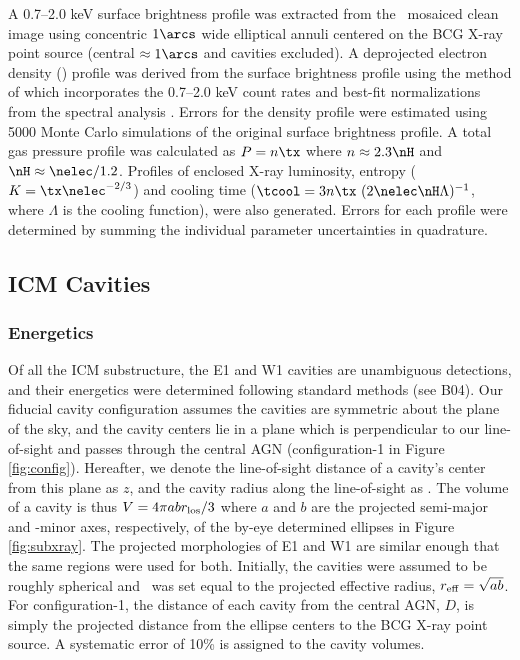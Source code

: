 \documentclass[iop]{emulateapj-rtx4}
\begin{document}
A 0.7--2.0 keV surface brightness profile was extracted from the
\cxo\ mosaiced clean image using concentric $1\arcs$ wide elliptical
annuli centered on the BCG X-ray point source (central $\approx
1\arcs$ and cavities excluded). A deprojected electron density
(\nelec) profile was derived from the surface brightness profile using
the method of \citet{kriss83} which incorporates the 0.7--2.0 keV
count rates and best-fit normalizations from the spectral analysis
\citep[see][for details]{accept}. Errors for the density profile were
estimated using 5000 Monte Carlo simulations of the original surface
brightness profile. A total gas pressure profile was calculated as $P
= n \tx$ where $n \approx 2.3 \nH$ and $\nH \approx
\nelec/1.2$. Profiles of enclosed X-ray luminosity, entropy ($K = \tx
\nelec^{-2/3}$) and cooling time ($\tcool = 3 n \tx~(2 \nelec \nH
\Lambda)^{-1}$, where $\Lambda$ is the cooling function), were also
generated. Errors for each profile were determined by summing the
individual parameter uncertainties in quadrature.

\subsection{ICM Cavities}
\label{sec:cavities}

\subsubsection{Energetics}
\label{sec:ecav}

Of all the ICM substructure, the E1 and W1 cavities are unambiguous
detections, and their energetics were determined following standard
methods (see B04). Our fiducial cavity configuration assumes the
cavities are symmetric about the plane of the sky, and the cavity
centers lie in a plane which is perpendicular to our line-of-sight and
passes through the central AGN (configuration-1 in Figure
\ref{fig:config}). Hereafter, we denote the line-of-sight distance of
a cavity's center from this plane as $z$, and the cavity radius along
the line-of-sight as \rlos. The volume of a cavity is thus $V = 4\pi a
b r_{\rm{los}}/3$ where $a$ and $b$ are the projected semi-major and -minor
axes, respectively, of the by-eye determined ellipses in Figure
\ref{fig:subxray}. The projected morphologies of E1 and W1 are similar
enough that the same regions were used for both. Initially, the
cavities were assumed to be roughly spherical and \rlos\ was set equal
to the projected effective radius, $r_{\rm{eff}} = \sqrt{ab}$. For
configuration-1, the distance of each cavity from the central AGN,
$D$, is simply the projected distance from the ellipse centers to the
BCG X-ray point source. A systematic error of 10\% is assigned to the
cavity volumes.
\end{document}
